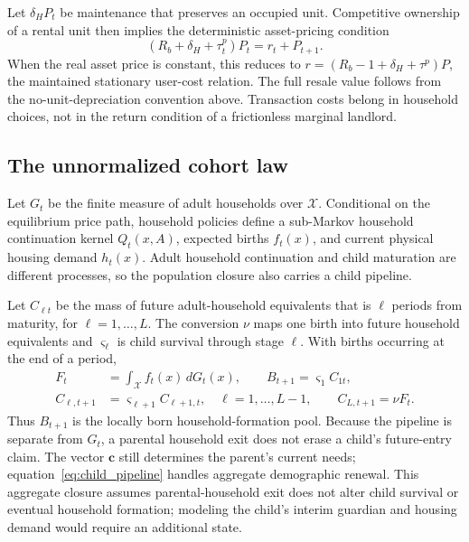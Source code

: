 \documentclass[11pt]{article}
\theoremstyle{definition}
\newcommand{\1}{\mathbf 1}
\newcommand{\X}{\mathcal X}
\begin{document}
Let $\delta_H P_t$ be maintenance that preserves an occupied unit. Competitive
ownership of a rental unit then implies the deterministic asset-pricing condition
\begin{equation}
 (R_b+\delta_H+\tau_t^p)P_t=r_t+P_{t+1}.
 \label{eq:dynamic_user_cost}
\end{equation}
When the real asset price is constant, this reduces to
$r=(R_b-1+\delta_H+\tau^p)P$, the maintained stationary user-cost relation.
The full resale value follows from the no-unit-depreciation convention above.
Transaction costs belong in household choices, not in the return condition of
a frictionless marginal landlord.

\subsection{The unnormalized cohort law}

Let $G_t$ be the finite measure of adult households over $\X$. Conditional on
the equilibrium price path, household policies define a sub-Markov household
continuation kernel $Q_t(x,A)$, expected births $f_t(x)$, and current physical
housing demand $h_t(x)$. Adult household continuation and child maturation are
different processes, so the population closure also carries a child pipeline.

Let $C_{\ell t}$ be the mass of future adult-household equivalents that is
$\ell$ periods from maturity, for $\ell=1,\ldots,L$. The conversion $\nu$
maps one birth into future household equivalents and $\varsigma_\ell$ is child
survival through stage $\ell$. With births occurring at the end of a period,
\begin{equation}
 \begin{split}
 F_t&=\int_{\X}f_t(x)\,dG_t(x),
 \qquad B_{t+1}=\varsigma_1 C_{1t},\\
 C_{\ell,t+1}&=\varsigma_{\ell+1}C_{\ell+1,t},
 \quad \ell=1,\ldots,L-1,
 \qquad C_{L,t+1}=\nu F_t.
 \end{split}
 \label{eq:child_pipeline}
\end{equation}
Thus $B_{t+1}$ is the locally born household-formation pool. Because the
pipeline is separate from $G_t$, a parental household exit does not erase a
child's future-entry claim. The vector $\mathbf c$ still determines the
parent's current needs; equation~\eqref{eq:child_pipeline} handles aggregate
demographic renewal. This aggregate closure assumes parental-household exit
does not alter child survival or eventual household formation; modeling the
child's interim guardian and housing demand would require an additional state.
\end{document}
